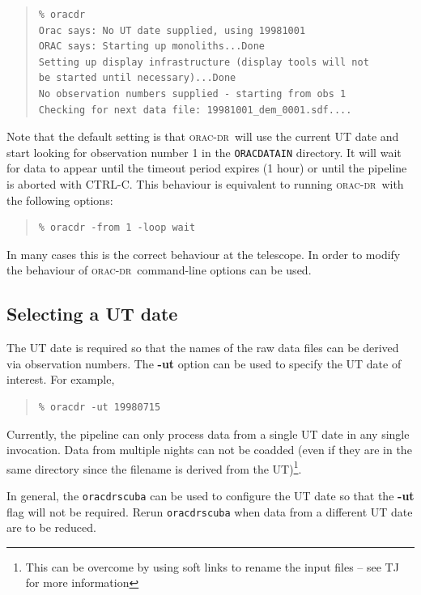 \documentclass[twoside,11pt]{article}
\newcommand{\xref}[3]{#1}
\newcommand{\xlabel}[1]{}
\renewcommand{\_}{\texttt{\symbol{95}}}
\newcommand{\oracdr}{\xref{\textsc{orac-dr}}{sun230}{}}
\newenvironment{myquote}{\begin{quote}\begin{small}}{\end{small}\end{quote}}
\begin{document}
\begin{myquote}
\begin{verbatim}
% oracdr
Orac says: No UT date supplied, using 19981001
ORAC says: Starting up monoliths...Done
Setting up display infrastructure (display tools will not
be started until necessary)...Done
No observation numbers supplied - starting from obs 1
Checking for next data file: 19981001_dem_0001.sdf....
\end{verbatim}
\end{myquote}
Note that the default setting is that \oracdr\ will use the current UT
date and start looking for observation number 1 in the \texttt{ORAC\_DATA\_IN}
directory. It will wait for data to appear until the timeout period expires 
(1 hour) or until the pipeline is aborted with CTRL-C. This behaviour
is equivalent to running \oracdr\ with the following options:
\begin{myquote}
\begin{verbatim}
% oracdr -from 1 -loop wait
\end{verbatim}
\end{myquote}

In many cases this is the correct behaviour at the telescope. In order to
modify the behaviour of \oracdr\ command-line options can be used.

\subsection{Selecting a UT date\xlabel{selecting_a_ut_date}}

The UT date is required so that the names of the raw data files can be
derived via observation numbers. The \textbf{-ut} option can be used
to specify the UT date of interest. For example,

\begin{myquote}
\begin{verbatim}
% oracdr -ut 19980715
\end{verbatim}
\end{myquote}

Currently, the pipeline can only process data from a single UT date in any
single invocation.  Data from multiple nights can not be coadded (even if they
are in the same directory since the filename is derived from the
UT)\footnote{This can be overcome by using soft links to rename the input files
-- see TJ for more information}.

In general, the \texttt{oracdr\_scuba} can be used to configure the
UT date so that the \textbf{-ut} flag will not be required.
Rerun \texttt{oracdr\_scuba} when data from a different UT date are to
be reduced.
\end{document}
